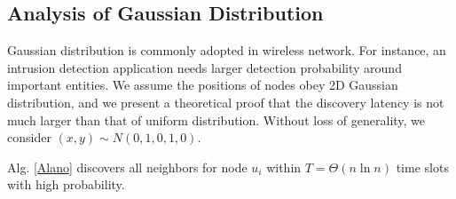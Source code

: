 \subsection{Analysis of Gaussian Distribution}
\label{normal}
Gaussian distribution is commonly adopted in wireless network. For instance, an intrusion detection application needs larger detection
probability around important entities\cite{wang2013gaussian}. We assume the positions of nodes obey 2D Gaussian distribution, and we present a theoretical proof that the discovery latency is not much larger than that of uniform distribution. Without loss of generality, we consider $(x,y) \sim N(0,1,0,1,0)$.

\begin{theorem}
Alg. \ref{Alano} discovers all neighbors for node $u_i$ within $T=\Theta(n\ln n)$ time slots with high probability.
\end{theorem}


